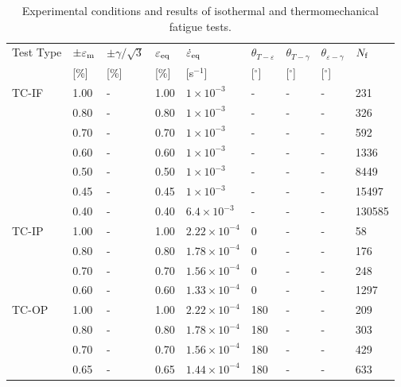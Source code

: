\documentclass[preprint,5p,twocolumn,11pt,sort&compress]{elsarticle}
\begin{document}
\begin{table*}[htbp]
  \centering
  \caption{Experimental conditions and results of isothermal and thermomechanical fatigue tests.} \vspace{0.1cm}
    \begin{tabular}{p{2cm}p{1.5cm}p{1.5cm}p{1.5cm}p{2.5cm}p{1cm}p{1cm}p{1cm}p{1cm}}
    \hline
    Test Type & $\pm \varepsilon _{\rm m}$ & $\pm \gamma/ \sqrt 3$ & $\varepsilon _{\rm eq}$ & $\dot \varepsilon _{\rm eq}$ & $\theta_{T-\varepsilon}$ & $\theta_{T-\gamma}$ & $\theta_{\varepsilon-\gamma}$ & $N_{\rm f}$ \\
          & [\%]  & [\%]  & [\%]  & [s$^{-1}$] & [$^\circ$] & [$^\circ$] & [$^\circ$] &  \\
    \hline
    TC-IF & 1.00  & -     & 1.00  & $1\times 10^{-3}$ & -     & -     & -     & 231 \\
          & 0.80  & -     & 0.80  & $1\times 10^{-3}$ & -     & -     & -     & 326 \\
          & 0.70  & -     & 0.70  & $1\times 10^{-3}$ & -     & -     & -     & 592 \\
          & 0.60  & -     & 0.60  & $1\times 10^{-3}$ & -     & -     & -     & 1336 \\
          & 0.50  & -     & 0.50  & $1\times 10^{-3}$ & -     & -     & -     & 8449 \\
          & 0.45  & -     & 0.45  & $1\times 10^{-3}$ & -     & -     & -     & 15497 \\
          & 0.40  & -     & 0.40  & $6.4\times 10^{-3}$ & -     & -     & -     & 130585 \\
    \hline
    TC-IP & 1.00  & -     & 1.00  & $2.22\times 10^{-4}$ & 0     & -     & -     & 58 \\
          & 0.80  & -     & 0.80  & $1.78\times 10^{-4}$ & 0     & -     & -     & 176 \\
          & 0.70  & -     & 0.70  & $1.56\times 10^{-4}$ & 0     & -     & -     & 248 \\
          & 0.60  & -     & 0.60  & $1.33\times 10^{-4}$ & 0     & -     & -     & 1297 \\
    \hline
    TC-OP & 1.00  & -     & 1.00  & $2.22\times 10^{-4}$ & 180   & -     & -     & 209 \\
          & 0.80  & -     & 0.80  & $1.78\times 10^{-4}$ & 180   & -     & -     & 303 \\
          & 0.70  & -     & 0.70  & $1.56\times 10^{-4}$ & 180   & -     & -     & 429 \\
          & 0.65  & -     & 0.65  & $1.44\times 10^{-4}$ & 180   & -     & -     & 633 \\

\end{tabular}
\end{table*}
\end{document}
